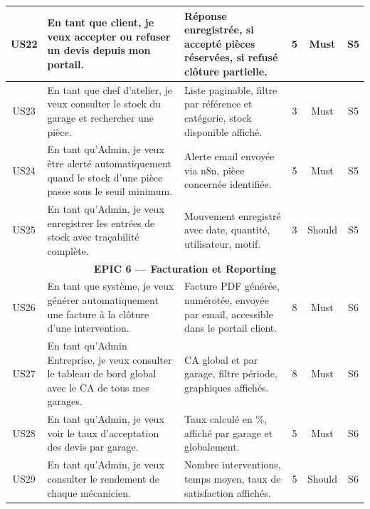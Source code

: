 \documentclass[12pt,a4paper]{report}
\begin{document}
\begin{longtable}{|c|p{4.5cm}|p{5.5cm}|c|c|c|}
US22 &
  En tant que client, je veux accepter ou refuser un devis depuis
  mon portail. &
  R\'{e}ponse enregistr\'{e}e, si accept\'{e} pi\`{e}ces r\'{e}serv\'{e}es,
  si refus\'{e} cl\^{o}ture partielle. &
  5 & Must & S5 \\
\hline

US23 &
  En tant que chef d'atelier, je veux consulter le stock du garage
  et rechercher une pi\`{e}ce. &
  Liste paginable, filtre par r\'{e}f\'{e}rence et cat\'{e}gorie,
  stock disponible affich\'{e}. &
  3 & Must & S5 \\
\hline

US24 &
  En tant qu'Admin, je veux \^{e}tre alert\'{e} automatiquement
  quand le stock d'une pi\`{e}ce passe sous le seuil minimum. &
  Alerte email envoy\'{e}e via n8n, pi\`{e}ce concern\'{e}e
  identifi\'{e}e. &
  5 & Must & S5 \\
\hline

US25 &
  En tant qu'Admin, je veux enregistrer les entr\'{e}es de stock
  avec tra\c{c}abilit\'{e} compl\`{e}te. &
  Mouvement enregistr\'{e} avec date, quantit\'{e}, utilisateur,
  motif. &
  3 & Should & S5 \\
\hline

\multicolumn{6}{|c|}{\cellcolor{primary!30}
  \textbf{EPIC 6 --- Facturation et Reporting}} \\
\hline

US26 &
  En tant que syst\`{e}me, je veux g\'{e}n\'{e}rer automatiquement
  une facture \`{a} la cl\^{o}ture d'une intervention. &
  Facture PDF g\'{e}n\'{e}r\'{e}e, num\'{e}rot\'{e}e, envoy\'{e}e
  par email, accessible dans le portail client. &
  8 & Must & S6 \\
\hline

US27 &
  En tant qu'Admin Entreprise, je veux consulter le tableau de bord
  global avec le CA de tous mes garages. &
  CA global et par garage, filtre p\'{e}riode, graphiques affich\'{e}s. &
  8 & Must & S6 \\
\hline

US28 &
  En tant qu'Admin, je veux voir le taux d'acceptation des devis
  par garage. &
  Taux calcul\'{e} en \%, affich\'{e} par garage et globalement. &
  5 & Must & S6 \\
\hline

US29 &
  En tant qu'Admin, je veux consulter le rendement de chaque
  m\'{e}canicien. &
  Nombre interventions, temps moyen, taux de satisfaction affich\'{e}s. &
  5 & Should & S6 \\
\hline


\end{longtable}
\end{document}
